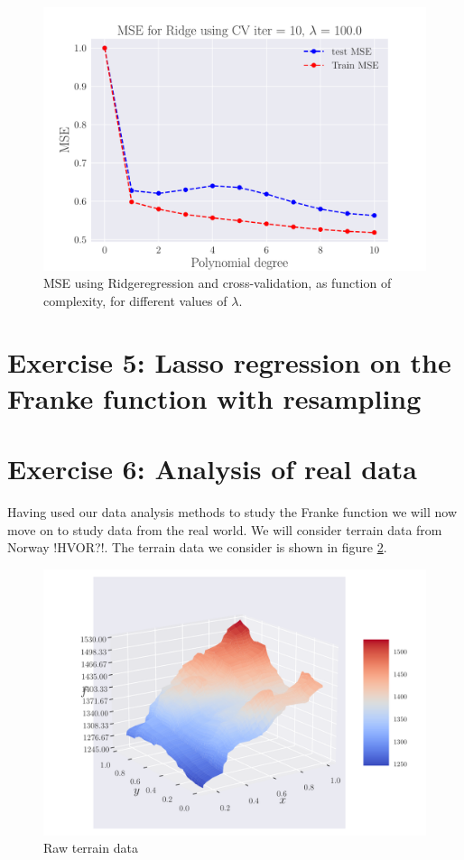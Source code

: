 \documentclass[reprint,english,notitlepage,aps,nobalancelastpage,nofootinbib]{revtex4-1}  %
\begin{document}
\begin{figure}[H]
	\endminipage\hfill
	\includegraphics[width=\linewidth]{MSE_Ridge_n30_eps02_pol10_CV_re10_lam_100_0.pdf}
	\endminipage
	\caption{MSE using Ridgeregression and cross-validation, as function of complexity, for different values of $\lambda$.} \label{fig:Ridge_CV_PM}
\end{figure}


\section*{Exercise 5: Lasso regression on the Franke function with resampling}


\section*{Exercise 6: Analysis of real data}

Having used our data analysis methods to study the Franke function we will now move on to study data from the real world. We will consider terrain data from Norway !HVOR?!. The terrain data we consider is shown in figure \ref{fig:terrain_raw}.

\begin{figure}[H]
  \includegraphics[width=\linewidth]{SRTM_rawdata_n50.pdf}
  \caption{Raw terrain data}
  \label{fig:terrain_raw}
\end{figure}
\end{document}

